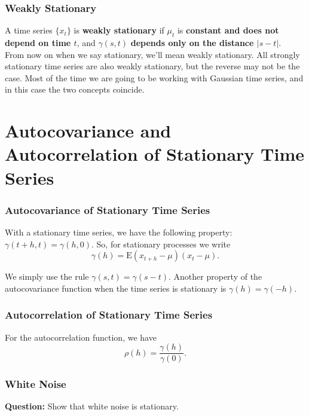 \documentclass[%
xcolor=pdftex]{beamer}
\begin{document}
\begin{frame}
\frametitle{Weakly Stationary}

A time series $\{x_t\}$ is \textbf{ weakly stationary} if $\mu_t$ is \textbf{constant and does not depend on time $t$}, and $\gamma(s,t)$ \textbf{depends only on the distance $|s-t|$}.  \\
\vspace{5mm}
From now on when we say stationary, we'll mean weakly  stationary.  All strongly stationary time series are also weakly stationary, but the reverse may not be the case.  Most of the time we are going to be working with Gaussian time series, and in this case the two concepts coincide.
\end{frame}

\section{Autocovariance and Autocorrelation of Stationary Time Series}
\frame{\tableofcontents[currentsection]}

\begin{frame}
\frametitle{Autocovariance of Stationary Time Series}

With a stationary time series, we have the following property: $\gamma(t+h,t)=\gamma(h,0)$. So, for stationary processes we write
\begin{equation}
\gamma(h)=\mbox{E}(x_{t+h}-\mu)(x_t-\mu).
\end{equation}

We simply use the rule $\gamma(s,t)=\gamma(s-t)$. Another property of the autocovariance function when the time series is stationary is $\gamma(h)=\gamma(-h)$.

\end{frame}

\begin{frame}
\frametitle{Autocorrelation of Stationary Time Series}

For the autocorrelation function, we have
\begin{equation} \label{eq:auto}
\rho(h) =\frac{\gamma(h)}{\gamma(0)}.
\end{equation}

\end{frame}

\begin{frame}
\frametitle{White Noise}

\textbf{Question:} Show that white noise is stationary.

\vspace{50mm}

\end{frame}
\end{document}
